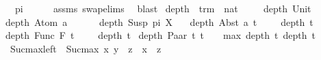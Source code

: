 \begin{isabellebody}
\ \ \ {\isachardoublequoteopen}pi\ {\isacharequal}{\kern0pt}\ {\isacharbrackleft}{\kern0pt}{\isacharbrackright}{\kern0pt}{\isachardoublequoteclose}\isanewline
%
\isadelimproof
\ \ %
\endisadelimproof
%
\isatagproof
{}\isamarkupfalse%
\ assms\ swap{\isachardot}{\kern0pt}elims\ \isamarkupfalse%
\ blast%
\endisatagproof
{\isafoldproof}%
%
\isadelimproof
\isanewline
%
\endisadelimproof
\isanewline
\isanewline
\isanewline
\isanewline
{}\isamarkupfalse%
\ depth\ {\isacharcolon}{\kern0pt}{\isacharcolon}{\kern0pt}\ {\isachardoublequoteopen}trm\ {\isasymRightarrow}\ nat{\isachardoublequoteclose}\isanewline
\ \ \isanewline
\ \ {\isachardoublequoteopen}depth\ {\isacharparenleft}{\kern0pt}Unit{\isacharparenright}{\kern0pt}\ \ \ \ \ \ {\isacharequal}{\kern0pt}\ {}{\isachardoublequoteclose}\isanewline
{\isacharbar}{\kern0pt}\ {\isachardoublequoteopen}depth\ {\isacharparenleft}{\kern0pt}Atom\ a{\isacharparenright}{\kern0pt}\ \ \ \ {\isacharequal}{\kern0pt}\ {}{\isachardoublequoteclose}\isanewline
{\isacharbar}{\kern0pt}\ {\isachardoublequoteopen}depth\ {\isacharparenleft}{\kern0pt}Susp\ pi\ X{\isacharparenright}{\kern0pt}\ {\isacharequal}{\kern0pt}\ {}{\isachardoublequoteclose}\isanewline
{\isacharbar}{\kern0pt}\ {\isachardoublequoteopen}depth\ {\isacharparenleft}{\kern0pt}Abst\ a\ t{\isacharparenright}{\kern0pt}\ \ {\isacharequal}{\kern0pt}\ {}\ {\isacharplus}{\kern0pt}\ depth\ t{\isachardoublequoteclose}\isanewline
{\isacharbar}{\kern0pt}\ {\isachardoublequoteopen}depth\ {\isacharparenleft}{\kern0pt}Func\ F\ t{\isacharparenright}{\kern0pt}\ \ {\isacharequal}{\kern0pt}\ {}\ {\isacharplus}{\kern0pt}\ depth\ t{\isachardoublequoteclose}\isanewline
{\isacharbar}{\kern0pt}\ {\isachardoublequoteopen}depth\ {\isacharparenleft}{\kern0pt}Paar\ t\ t{\isacharprime}{\kern0pt}{\isacharparenright}{\kern0pt}\ {\isacharequal}{\kern0pt}\ {}\ {\isacharplus}{\kern0pt}\ {\isacharparenleft}{\kern0pt}max\ {\isacharparenleft}{\kern0pt}depth\ t{\isacharparenright}{\kern0pt}\ {\isacharparenleft}{\kern0pt}depth\ t{\isacharprime}{\kern0pt}{\isacharparenright}{\kern0pt}{\isacharparenright}{\kern0pt}{\isachardoublequoteclose}\ \isanewline
\isanewline
{}\isamarkupfalse%
\ \isanewline
\ \ Suc{\isacharunderscore}{\kern0pt}max{\isacharunderscore}{\kern0pt}left{\isacharcolon}{\kern0pt}\ \ {\isachardoublequoteopen}Suc{\isacharparenleft}{\kern0pt}max\ x\ y{\isacharparenright}{\kern0pt}\ {\isacharequal}{\kern0pt}\ z\ {\isasymlongrightarrow}\ x\ {\isacharless}{\kern0pt}\ z{\isachardoublequoteclose}\ \isanewline

\end{isabellebody}

